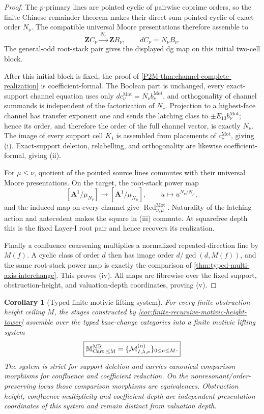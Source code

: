 \documentclass[11pt]{article}
\newtheorem{corollary}[theorem]{Corollary}
\theoremstyle{remark}
\newcommand{\Z}{\mathbf Z}
\newcommand{\Mot}{\mathrm{Mot}}
\begin{document}
\begin{proof}
The \(p\)-primary lines are pointed cyclic of pairwise coprime orders, so the
finite Chinese remainder theorem makes their direct sum pointed cyclic of
exact order \(N_\nu\).  The compatible universal Moore presentations therefore
assemble to
\[
 \Z C_\nu\xrightarrow{\,N_\nu\,}\Z B_\nu,
 \qquad dC_\nu=N_\nu B_\nu.
\]
The general-odd root-stack pair gives the displayed dg map on this initial
two-cell block.

After this initial block is fixed, the proof of
\cref{P2M-thm:channel-complete-realization} is coefficient-formal.  The Boolean
part is unchanged, every exact-support channel equation uses only
\(dc_\nu^{\Mot}=N_\nu b_\nu^{\Mot}\), and orthogonality of channel summands is
independent of the factorization of \(N_\nu\).  Projection to a highest-face
channel has transfer exponent one and sends the latching class to
\(\pm E_{13}b_\nu^{\Mot}\); hence its order, and therefore the order of the full
channel vector, is exactly \(N_\nu\).  The image of every support cell \(K_I\)
is assembled from placements of \(c_\nu^{\Mot}\), giving (i).  Exact-support
deletion, relabelling, and orthogonality are likewise coefficient-formal,
giving (ii).

For \(\mu\le\nu\), quotient of the pointed source lines commutes with their
universal Moore presentations.  On the target, the root-stack power map
\[
 [\mathbf A^1/\mu_{N_\nu}]
 \longrightarrow
 [\mathbf A^1/\mu_{N_\mu}],
 \qquad u\longmapsto u^{N_\nu/N_\mu},
\]
and the induced map on every channel give
\(\operatorname{Red}_{\nu,\mu}^{\Mot}\).  Naturality of the latching action and
antecedent makes the square in (iii) commute.  At squarefree depth this is the
fixed Layer-I root pair and hence recovers its realization.

Finally a confluence coarsening multiplies a normalized repeated-direction
line by \(M(f)\).  A cyclic class of order \(d\) then has image order
\(d/\gcd(d,M(f))\), and the same root-stack power map is exactly the comparison
of \cref{thm:typed-multi-axis-interchange}.  This proves (iv).  All maps are
fibrewise over the fixed support, obstruction-height, and valuation-depth
coordinates, proving (v).
\end{proof}

\begin{corollary}[Typed finite motivic lifting system]
\label{cor:typed-finite-recursive-motivic-tower}
For every finite obstruction-height ceiling $M$, the stages constructed by
\cref{cor:finite-recursive-motivic-height-tower} assemble over the typed base-change
categories into a finite motivic lifting system
\[
 \boxed{
 \mathbb M_{\rm Cart,\le M}^{\rm MR}
 =
 \{\mathcal M^{(n)}_{I,\lambda,\nu}\}_{0\le n\le M}.}
\]
The system is strict for support deletion and carries canonical comparison morphisms for
confluence and coefficient reduction.  On the nonresonant/order-preserving locus those
comparison morphisms are equivalences.  Obstruction height, confluence multiplicity and
coefficient depth are independent presentation coordinates of this system and remain
distinct from valuation depth.
\end{corollary}
\end{document}
